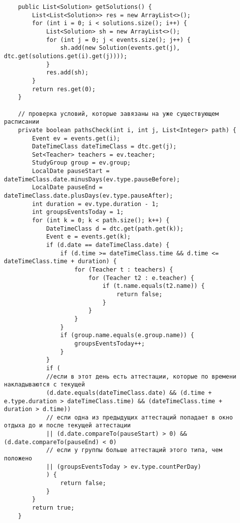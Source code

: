 \begin{lstlisting}
	public List<Solution> getSolutions() {
		List<List<Solution>> res = new ArrayList<>();
		for (int i = 0; i < solutions.size(); i++) {
			List<Solution> sh = new ArrayList<>();
			for (int j = 0; j < events.size(); j++) {
				sh.add(new Solution(events.get(j), dtc.get(solutions.get(i).get(j))));
			}
			res.add(sh);
		}
		return res.get(0);
	}
	
	// проверка условий, которые завязаны на уже существующем расписании
	private boolean pathsCheck(int i, int j, List<Integer> path) {
		Event ev = events.get(i);
		DateTimeClass dateTimeClass = dtc.get(j);
		Set<Teacher> teachers = ev.teacher;
		StudyGroup group = ev.group;
		LocalDate pauseStart = dateTimeClass.date.minusDays(ev.type.pauseBefore);
		LocalDate pauseEnd = dateTimeClass.date.plusDays(ev.type.pauseAfter);
		int duration = ev.type.duration - 1;
		int groupsEventsToday = 1;
		for (int k = 0; k < path.size(); k++) {
			DateTimeClass d = dtc.get(path.get(k));
			Event e = events.get(k);
			if (d.date == dateTimeClass.date) {
				if (d.time >= dateTimeClass.time && d.time <= dateTimeClass.time + duration) {
					for (Teacher t : teachers) {
						for (Teacher t2 : e.teacher) {
							if (t.name.equals(t2.name)) {
								return false;
							}
						}
					}
				}
				if (group.name.equals(e.group.name)) {
					groupsEventsToday++;
				}
			}
			if (
			//если в этот день есть аттестации, которые по времени накладываются с текущей
			(d.date.equals(dateTimeClass.date) && (d.time + e.type.duration > dateTimeClass.time) && (dateTimeClass.time + duration > d.time))
			// если одна из предыдущих аттестаций попадает в окно отдыха до и после текущей аттестации
			|| (d.date.compareTo(pauseStart) > 0) && (d.date.compareTo(pauseEnd) < 0)
			// если у группы больше аттестаций этого типа, чем положено
			|| (groupsEventsToday > ev.type.countPerDay)
			) {
				return false;
			}
		}
		return true;
	}
	

\end{lstlisting}
